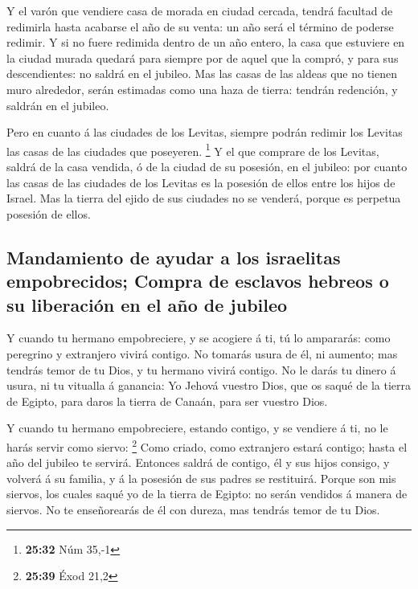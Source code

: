  Y el varón que vendiere casa de morada en ciudad cercada,
tendrá facultad de redimirla hasta acabarse el año de su venta: un año
será el término de poderse redimir.  Y si no fuere redimida
dentro de un año entero, la casa que estuviere en la ciudad murada
quedará para siempre por de aquel que la compró, y para sus
descendientes: no saldrá en el jubileo.  Mas las casas de
las aldeas que no tienen muro alrededor, serán estimadas como una haza
de tierra: tendrán redención, y saldrán en el jubileo.

 Pero en cuanto á las ciudades de los Levitas, siempre
podrán redimir los Levitas las casas de las ciudades que poseyeren.
\footnote{\textbf{25:32} Núm 35,-1}  Y el que comprare de
los Levitas, saldrá de la casa vendida, ó de la ciudad de su posesión,
en el jubileo: por cuanto las casas de las ciudades de los Levitas es la
posesión de ellos entre los hijos de Israel.  Mas la tierra
del ejido de sus ciudades no se venderá, porque es perpetua posesión de
ellos.

\hypertarget{mandamiento-de-ayudar-a-los-israelitas-empobrecidos-compra-de-esclavos-hebreos-o-su-liberaciuxf3n-en-el-auxf1o-de-jubileo}{%
\subsection{Mandamiento de ayudar a los israelitas empobrecidos; Compra
de esclavos hebreos o su liberación en el año de
jubileo}\label{mandamiento-de-ayudar-a-los-israelitas-empobrecidos-compra-de-esclavos-hebreos-o-su-liberaciuxf3n-en-el-auxf1o-de-jubileo}}

 Y cuando tu hermano empobreciere, y se acogiere á ti, tú
lo ampararás: como peregrino y extranjero vivirá contigo. 
No tomarás usura de él, ni aumento; mas tendrás temor de tu Dios, y tu
hermano vivirá contigo.  No le darás tu dinero á usura, ni
tu vitualla á ganancia:  Yo Jehová vuestro Dios, que os
saqué de la tierra de Egipto, para daros la tierra de Canaán, para ser
vuestro Dios.

 Y cuando tu hermano empobreciere, estando contigo, y se
vendiere á ti, no le harás servir como siervo: \footnote{\textbf{25:39}
  Éxod 21,2}  Como criado, como extranjero estará contigo;
hasta el año del jubileo te servirá.  Entonces saldrá de
contigo, él y sus hijos consigo, y volverá á su familia, y á la posesión
de sus padres se restituirá.  Porque son mis siervos, los
cuales saqué yo de la tierra de Egipto: no serán vendidos á manera de
siervos.  No te enseñorearás de él con dureza, mas tendrás
temor de tu Dios.

